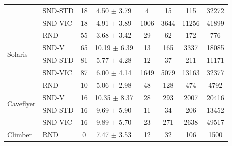 \documentclass[a4paper,11pt]{elsarticle}
\begin{document}
\begin{table}[t!]
\begin{tabular}{l|l|cccccc}
& \multicolumn{1}{l|}{SND-STD} & \multicolumn{1}{c}{18} & \multicolumn{1}{c}{4.50 $\pm$ 3.79} & \multicolumn{1}{c}{4} & \multicolumn{1}{c}{15} & \multicolumn{1}{c}{115} & \multicolumn{1}{c}{32272} \\
& \multicolumn{1}{l|}{SND-VIC} & \multicolumn{1}{c}{18} & \multicolumn{1}{c}{4.91 $\pm$ 3.89} & \multicolumn{1}{c}{1006} & \multicolumn{1}{c}{3644} & \multicolumn{1}{c}{11256} & \multicolumn{1}{c}{41899} \\
\hline%
\multirow{4}{*}{Solaris}
& \multicolumn{1}{l|}{RND} & \multicolumn{1}{c}{55} & \multicolumn{1}{c}{3.68 $\pm$ 3.42} & \multicolumn{1}{c}{29} & \multicolumn{1}{c}{62} & \multicolumn{1}{c}{172} & \multicolumn{1}{c}{776} \\
& \multicolumn{1}{l|}{SND-V} & \multicolumn{1}{c}{65} & \multicolumn{1}{c}{10.19 $\pm$ 6.39} & \multicolumn{1}{c}{13} & \multicolumn{1}{c}{165} & \multicolumn{1}{c}{3337} & \multicolumn{1}{c}{18085} \\
& \multicolumn{1}{l|}{SND-STD} & \multicolumn{1}{c}{81} & \multicolumn{1}{c}{5.77 $\pm$ 4.28} & \multicolumn{1}{c}{12} & \multicolumn{1}{c}{37} & \multicolumn{1}{c}{211} & \multicolumn{1}{c}{11171} \\
& \multicolumn{1}{l|}{SND-VIC} & \multicolumn{1}{c}{87} & \multicolumn{1}{c}{6.00 $\pm$ 4.14} & \multicolumn{1}{c}{1649} & \multicolumn{1}{c}{5079} & \multicolumn{1}{c}{13163} & \multicolumn{1}{c}{32377} \\
\hline\hline
\multirow{4}{*}{Caveflyer}
& \multicolumn{1}{l|}{RND} & \multicolumn{1}{c}{10} & \multicolumn{1}{c}{5.06 $\pm$ 2.98} & \multicolumn{1}{c}{48} & \multicolumn{1}{c}{128} & \multicolumn{1}{c}{474} & \multicolumn{1}{c}{4792} \\
& \multicolumn{1}{l|}{SND-V} & \multicolumn{1}{c}{16} & \multicolumn{1}{c}{10.35 $\pm$ 8.37} & \multicolumn{1}{c}{28} & \multicolumn{1}{c}{293} & \multicolumn{1}{c}{2007} & \multicolumn{1}{c}{20416} \\
& \multicolumn{1}{l|}{SND-STD} & \multicolumn{1}{c}{16} & \multicolumn{1}{c}{9.69 $\pm$ 5.90} & \multicolumn{1}{c}{11} & \multicolumn{1}{c}{34} & \multicolumn{1}{c}{206} & \multicolumn{1}{c}{13452} \\
& \multicolumn{1}{l|}{SND-VIC} & \multicolumn{1}{c}{16} & \multicolumn{1}{c}{9.89 $\pm$ 5.70} & \multicolumn{1}{c}{23} & \multicolumn{1}{c}{271} & \multicolumn{1}{c}{2638} & \multicolumn{1}{c}{49517} \\
\hline%
\multirow{4}{*}{Climber}
& \multicolumn{1}{l|}{RND} & \multicolumn{1}{c}{0} & \multicolumn{1}{c}{7.47 $\pm$ 3.53} & \multicolumn{1}{c}{12} & \multicolumn{1}{c}{32} & \multicolumn{1}{c}{106} & \multicolumn{1}{c}{1500} \\

\end{tabular}
\end{table}
\end{document}
